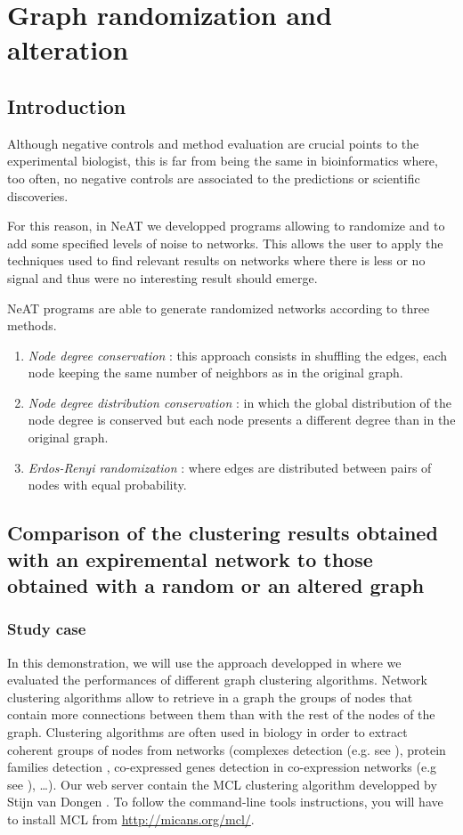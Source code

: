 \chapter{Graph randomization and alteration}

\section{Introduction}
Although negative controls and method evaluation are crucial points to the experimental biologist, 
this is far from being the same in bioinformatics where, too often, no negative controls are associated to 
the predictions or scientific discoveries.

For this reason, in NeAT we developped programs allowing to randomize and to add some specified levels of noise to networks. This allows the user to apply the techniques used to find relevant results on networks where there is less or no signal and thus were no interesting result should emerge.

NeAT programs are able to generate randomized networks according to three methods. 
\begin{enumerate}
 \item \textit{Node degree conservation} : this approach consists in shuffling the edges, each node keeping the same number of neighbors as in the original graph.
 \item \textit{Node degree distribution conservation} : in which the global distribution of the node degree is conserved but each node presents a different degree than in the original graph.
 \item \textit{Erdos-Renyi randomization} :  where edges are distributed between pairs of nodes with equal probability.
\end{enumerate}


\section{Comparison of the clustering results obtained with an expiremental network to those obtained with a random or an altered graph}
\subsection{Study case}

In this demonstration, we will use the approach developped in \cite{Brohee2006} where we evaluated the performances of different graph clustering algorithms. Network clustering algorithms allow to retrieve in a graph the groups of nodes that contain more connections between them than with the rest of the nodes of the graph. Clustering algorithms are often used in biology in order to extract coherent groups of nodes from networks (complexes detection (e.g. see \cite{Sharan2007,Krogan2006,Brohee2006,Pereira-Leal2004}), protein families detection \cite{Enright2002}, co-expressed genes detection in co-expression networks (e.g see \cite{Lattimore2005}), \ldots). Our web server contain the MCL clustering algorithm developped by Stijn van Dongen \cite{VanDongenPHD2000,Enright2002}. To follow the command-line tools instructions, you will have to install MCL from \url{http://micans.org/mcl/}.

